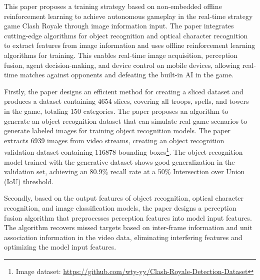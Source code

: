 \clearpage
\setcounter{footnote}{0}

\titlespacing{\chapter}{0pt}{0mm}{5mm}

\noindent This paper proposes a training strategy based on non-embedded offline reinforcement learning to achieve autonomous gameplay in the real-time strategy game Clash Royale through image information input. The paper integrates cutting-edge algorithms for object recognition and optical character recognition to extract features from image information and uses offline reinforcement learning algorithms for training. This enables real-time image acquisition, perception fusion, agent decision-making, and device control on mobile devices, allowing real-time matches against opponents and defeating the built-in AI in the game.

\noindent Firstly, the paper designs an efficient method for creating a sliced dataset and produces a dataset containing 4654 slices, covering all troops, spells, and towers in the game, totaling 150 categories. The paper proposes an algorithm to generate an object recognition dataset that can simulate real-game scenarios to
generate labeled images for training object recognition models. The paper extracts 6939 images from video streams, creating an object recognition validation dataset containing 116878 bounding boxes\footnote{Image dataset: \url{https://github.com/wty-yy/Clash-Royale-Detection-Dataset}\hfill}. The object recognition model trained with the generative dataset shows good generalization in the validation set, achieving an 80.9\% recall rate at a 50\% Intersection over Union (IoU) threshold.

\noindent Secondly, based on the output features of object recognition, optical character recognition, and image classification models, the paper designs a perception fusion algorithm that preprocesses perception features into model input features. The algorithm recovers missed targets based on inter-frame information and unit association information in the video data, eliminating interfering features and optimizing the model input features.

